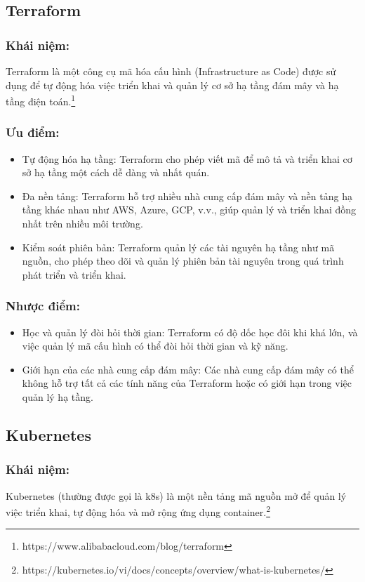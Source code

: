 \subsection{Terraform}
\subsubsection{Khái niệm:}
\indent Terraform là một công cụ mã hóa cấu hình (Infrastructure as Code) được sử dụng để tự động hóa việc triển khai và quản lý cơ sở hạ tầng đám mây và hạ tầng điện toán.\footnote{https://www.alibabacloud.com/blog/terraform}
\subsubsection{Ưu điểm:}
\begin{itemize}
    \item Tự động hóa hạ tầng: 
    Terraform cho phép viết mã để mô tả và triển khai cơ sở hạ tầng một cách dễ dàng và nhất quán.
    \item Đa nền tảng: 
    Terraform hỗ trợ nhiều nhà cung cấp đám mây và nền tảng hạ tầng khác nhau như AWS, Azure, GCP, v.v., giúp quản lý và triển khai đồng nhất trên nhiều môi trường.
    \item Kiểm soát phiên bản: 
    Terraform quản lý các tài nguyên hạ tầng như mã nguồn, cho phép theo dõi và quản lý phiên bản tài nguyên trong quá trình phát triển và triển khai.
\end{itemize}
\subsubsection{Nhược điểm:}
\begin{itemize}
    \item Học và quản lý đòi hỏi thời gian: Terraform có độ dốc học đôi khi khá lớn, và việc quản lý mã cấu hình có thể đòi hỏi thời gian và kỹ năng.
    \item Giới hạn của các nhà cung cấp đám mây: Các nhà cung cấp đám mây có thể không hỗ trợ tất cả các tính năng của Terraform hoặc có giới hạn trong việc quản lý hạ tầng.
\end{itemize}
\subsection{Kubernetes}
\subsubsection{Khái niệm:}
\indent Kubernetes (thường được gọi là k8s) là một nền tảng mã nguồn mở để quản lý việc triển khai, tự động hóa và mở rộng ứng dụng container.\footnote{https://kubernetes.io/vi/docs/concepts/overview/what-is-kubernetes/}


